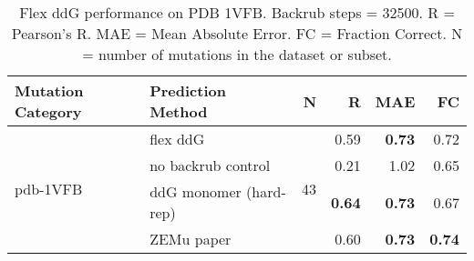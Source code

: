 \begin{table}
  \begin{tabular}{llrrrr}
\toprule
Mutation Category &       Prediction Method &   N &    R &  MAE &   FC \\
\midrule
 \multirow{ 4}{*}{pdb-1VFB} & flex ddG & \multirow{ 4}{*}{43} & 0.59 & \textbf{0.73} & 0.72  \\
 & no backrub control & & 0.21 & 1.02 & 0.65  \\
 & ddG monomer (hard-rep) & & \textbf{0.64} & \textbf{0.73} & 0.67  \\
 & ZEMu paper & & 0.60 & \textbf{0.73} & \textbf{0.74}  \\
\bottomrule
\end{tabular}
  \caption[Flex ddG performance on PDB 1VFB]{
    Flex ddG performance on PDB 1VFB. Backrub steps = 32500. R = Pearson's R. MAE = Mean Absolute Error. FC = Fraction Correct. N = number of mutations in the dataset or subset.
  } \label{tab:table-pdb-1VFB}
\end{table}
